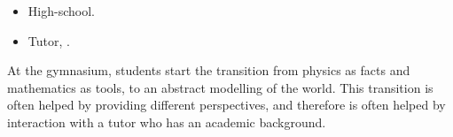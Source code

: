 \documentclass{goose-article}
\begin{document}
\begin{tcolorbox}
    \begin{itemize}
        \item High-school.
        \item Tutor, \MyDateTutor.
    \end{itemize}
\end{tcolorbox}

\noindent
At the gymnasium, students start the transition from physics as facts and mathematics as tools, to an abstract modelling of the world.
This transition is often helped by providing different perspectives, and therefore is often helped by interaction with a tutor who has an academic background.
\end{document}
